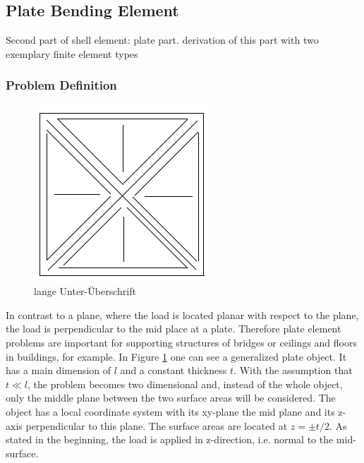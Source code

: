  \subsection{Plate Bending Element}
 Second part of shell element: plate part. derivation of this part with two exemplary finite element types
  
  
  
  \subsubsection{Problem Definition}
  \begin{figure}
  	\centering
  	\includegraphics[width=0.7\linewidth]{figures/platzhalter}
  	\caption[kurze Unter-Überschrift]{lange Unter-Überschrift}
  	\label{fig:platzhalter}
  \end{figure}
  In contrast to a plane, where the load is located planar with respect to the plane, the load is perpendicular to the mid place at a plate. Therefore plate element problems are important for supporting structures of bridges or ceilings and floors in buildings, for example. In Figure \ref{fig:platzhalter} one can see a generalized plate object. It has a main dimension of $l$ and a constant thickness $t$. With the assumption that $t \ll l$, the problem becomes two dimensional and, instead of the whole object, only the middle plane between the two surface areas will be considered. The object has a local coordinate system with its xy-plane the mid plane and its z-axis perpendicular to this plane. The surface areas are located at $z = \pm t/2$. As stated in the beginning, the load is applied in z-direction, i.e. normal to the mid-surface.
  
